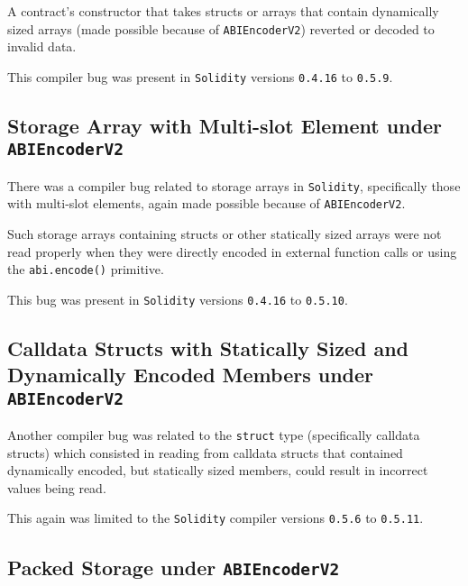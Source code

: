 A contract's constructor that takes structs or arrays that contain
dynamically sized arrays (made possible because of
\texttt{ABIEncoderV2}) reverted or decoded to invalid data.

This compiler bug was present in \texttt{Solidity} versions
\texttt{0.4.16} to \texttt{0.5.9}.

\subsection{\texorpdfstring{Storage Array with Multi-slot Element under
\texttt{ABIEncoderV2}}{Storage Array with Multi-slot Element under ABIEncoderV2}}\label{storage-array-with-multi-slot-element-under-abiencoderv2}

There was a compiler bug related to storage arrays in \texttt{Solidity},
specifically those with multi-slot elements, again made possible because
of \texttt{ABIEncoderV2}.

Such storage arrays containing structs or other statically sized arrays
were not read properly when they were directly encoded in external
function calls or using the \texttt{abi.encode()} primitive.

This bug was present in \texttt{Solidity} versions \texttt{0.4.16} to
\texttt{0.5.10}.

\subsection{\texorpdfstring{Calldata Structs with Statically Sized and
Dynamically Encoded Members under
\texttt{ABIEncoderV2}}{Calldata Structs with Statically Sized and Dynamically Encoded Members under ABIEncoderV2}}\label{calldata-structs-with-statically-sized-and-dynamically-encoded-members-under-abiencoderv2}

Another compiler bug was related to the \texttt{struct} type
(specifically calldata structs) which consisted in reading from calldata
structs that contained dynamically encoded, but statically sized
members, could result in incorrect values being read.

This again was limited to the \texttt{Solidity} compiler versions
\texttt{0.5.6} to \texttt{0.5.11}.

\subsection{\texorpdfstring{Packed Storage under
\texttt{ABIEncoderV2}}{Packed Storage under ABIEncoderV2}}\label{packed-storage-under-abiencoderv2}

